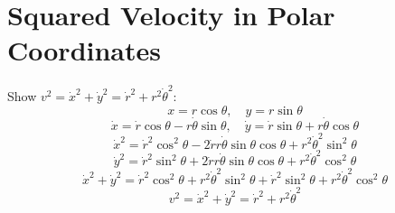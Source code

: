\documentclass[aps,twocolumn]{revtex4-1}
\begin{document}
\section{Squared Velocity in Polar Coordinates}
Show $v^2 = \dot x^2 + \dot y^2 = \dot r^2 + r^2 \dot \theta^2$:
\begin{equation*}
    x=r\cos{\theta}, \quad y=r\sin{\theta} \tag{Change of Coordinates}
\end{equation*}
\begin{equation*}
    \dot x = \dot r\cos{\theta} - r\dot \theta \sin{\theta}, \quad
    \dot y = \dot r\sin{\theta} + r\dot \theta \cos{\theta}
    \tag{Chain Rule}
\end{equation*}
\begin{equation*}
    \dot x^2 = \dot r^2\cos^2\theta-2\dot r r \dot \theta  \sin{\theta} \cos{\theta} + r^2 \dot \theta^2\sin^2\theta
\end{equation*}
\begin{equation*}
    \dot y^2 = \dot r^2\sin^2\theta + 2\dot r r \dot \theta  \sin{\theta} \cos{\theta} + r^2 \dot \theta^2\cos^2\theta
\end{equation*}
\begin{equation*}
    \dot x^2 + \dot y^2 = \dot r^2\cos^2\theta + r^2 \dot \theta^2\sin^2\theta + \dot r^2\sin^2\theta +  r^2 \dot \theta^2\cos^2\theta \tag{Combine}
\end{equation*}
\begin{equation*}
    v^2 = \dot x^2 + \dot y^2 = \dot r^2 + r^2 \dot \theta^2 \tag{Pythagorean Identity}
\end{equation*}
\end{document}
